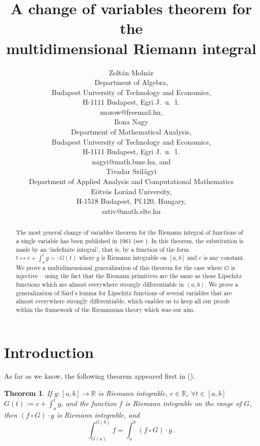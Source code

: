 \documentclass{article}
\title{A change of variables theorem for the \\ multidimensional Riemann integral
}
\author{Zolt\'an Moln\'ar\\
Department of Algebra,\\
Budapest University of Technology
and Economics,\\
H-1111 Budapest, Egri J.~u.~1.\\
mozow@freemail.hu,\\
Ilona Nagy\\
Department of Mathematical Analysis,\\
Budapest University of Technology
and Economics,\\
H-1111 Budapest, Egri J.~u.~1.\\
nagyi@math.bme.hu,
and\\ Tivadar Szil\'agyi\\
Department of Applied Analysis and
Computational Mathematics\\
E\"otv\"os Lor\'and University,\\
H-1518 Budapest, Pf.120, Hungary,\\
sztiv@math.elte.hu}
\newtheorem{theorem}{Theorem}
\newcommand{\R}{\ensuremath{\mathbb R}}
\begin{document}
\maketitle\thispagestyle{empty}
\begin{abstract}
The most general change of variables theorem for the Riemann
integral of functions of a single variable has been published in
1961 (see \cite{Kestelman:61}). In this theorem, the substitution
is made by an `indefinite integral', that is, by a function of the
form \(t\mapsto c+\int_a^tg=:G(t)\) where \(g\) is Riemann integrable on
\([a,b]\) and \(c\) is any constant. We prove a multidimensional
generalization of this theorem for the case where $G$ is injective
-- using the fact that the
Riemann primitives are the same as those Lipschitz functions which
are almost everywhere strongly differentiable in \((a,b)\). We
prove a generalization of Sard's lemma for Lipschitz functions of several
variables that are almost everywhere strongly differentiable,
which enables us to keep all our proofs within the framework of
the Riemannian theory which was our aim.
\end{abstract}

\renewcommand{\thefootnote}{}

\section{Introduction}\label{section1}

As far as we know, the following theorem appeared first in
(\cite{Kestelman:61}).

\begin{theorem} \label{Kestelman:61}
If \(g:[a,b]\to\R\) is Riemann integrable, \(c\in\R\), \(\forall  t\in[a,b]\)
 \(G(t):=c+\int_a^tg\), and the function \(f\) is Riemann integrable
 on the range of \(G\), then \((f\circ G)\cdot g\) is Riemann integrable, and
\[\int_{G(a)}^{G(b)}f=\int_a^b(f\circ G)\cdot g\,.\]
\end{theorem}
\end{document}
